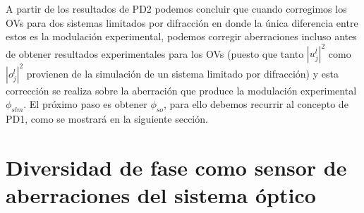 A partir de los resultados de PD2 podemos concluir que cuando corregimos los OVs para dos sistemas limitados por difracción en donde la única diferencia entre estos es la modulación experimental, podemos corregir aberraciones incluso antes de obtener resultados experimentales para los OVs (puesto que tanto $|u_j^l|^2$ como $|o_j^l|^2$ provienen de la simulación de un sistema limitado por difracción) y esta corrección se realiza sobre la aberración que produce la modulación experimental $\phi_{slm}$. El próximo paso es obtener $\phi_{so}$, para ello debemos recurrir al concepto de PD1, como se mostrará en la siguiente sección.
%
%


\section{Diversidad de fase como sensor de aberraciones del sistema óptico}
\label{sec:cor_pd1}


